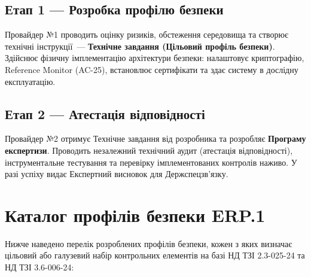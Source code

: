 \subsection{Етап 1 --- Розробка профілю безпеки}

Провайдер №1 проводить оцінку ризиків, обстеження середовища та створює технічні інструкції~---
\textbf{Технічне завдання (Цільовий профіль безпеки)}. Здійснює фізичну імплементацію архітектури
безпеки: налаштовує криптографію, Reference Monitor (AC-25), встановлює сертифікати та здає
систему в дослідну експлуатацію.

\subsection{Етап 2 --- Атестація відповідності}

Провайдер №2 отримує Технічне завдання від розробника та розробляє \textbf{Програму експертизи}.
Проводить незалежний технічний аудит (атестація відповідності), інструментальне тестування та перевірку імплементованих
контролів наживо. У разі успіху видає Експертний висновок для Держспецзв'язку.

\section{Каталог профілів безпеки ERP.1}

Нижче наведено перелік розроблених профілів безпеки, кожен з яких визначає цільовий або
галузевий набір контрольних елементів на базі НД ТЗІ 2.3-025-24 та НД ТЗІ 3.6-006-24:

